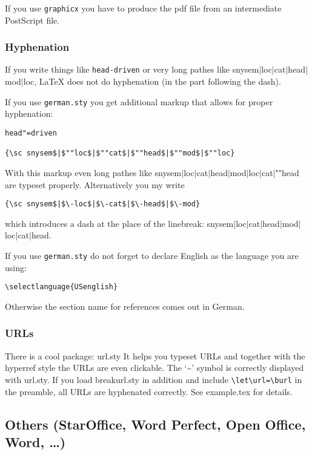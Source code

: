 \documentclass[11pt,a4paper,fleqn]{article}
\begin{document}
If you use \verb+graphicx+ you have to produce the pdf file from
an intermediate PostScript file.

\subsubsection{Hyphenation}
\label{hyphenation}

If you write things like \verb+head-driven+ or very long pathes like
{\sc snysem$|$loc$|$cat$|$head$|$mod$|$loc}, \LaTeX{} does not do hyphenation
(in the part following the dash).

If you use \verb+german.sty+ you get additional markup that allows for proper hyphenation:
\begin{verbatim}
head"=driven

{\sc snysem$|$""loc$|$""cat$|$""head$|$""mod$|$""loc}
\end{verbatim}
With this markup even long pathes like {\sc snysem$|$loc$|$cat$|$head$|$mod$|$loc$|$cat$|$""head}
are typeset properly. Alternatively you my write
\begin{verbatim}
{\sc snysem$|$\-loc$|$\-cat$|$\-head$|$\-mod}
\end{verbatim}
which introduces a dash at the place of the linebreak:
{\sc snysem$|$\-loc$|$\-cat$|$\-head$|$\-mod$|$\-loc$|$\-cat$|$\-head}.

If you use \verb+german.sty+ do not forget to declare English as the language
you are using:
\begin{verbatim}
\selectlanguage{USenglish}
\end{verbatim}
Otherwise the section name for references comes out in German.

\subsubsection{URLs}

There is a cool package: url.sty It helps you typeset URLs and together with the hyperref style the
URLs are even clickable. The `\~{}' symbol is correctly displayed with url.sty. If you load
breakurl.sty in addition and include \verb+\let\url=\burl+ in the preamble, all URLs are hyphenated
correctly. See example.tex for details.





\subsection{Others (StarOffice, Word Perfect, Open Office, Word, \ldots)}
\end{document}
